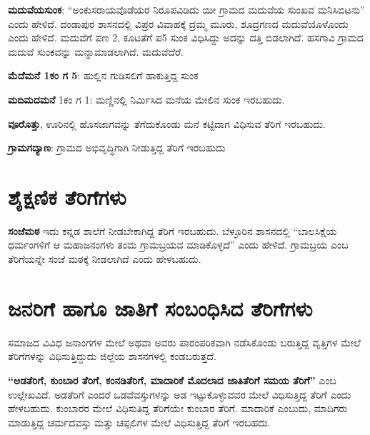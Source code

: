 \textbf{ಮದುವೆಯಸುಂಕ}: “ಅಂಕುಸರಾಯವೊಡೆಯರ ನಿರೂಪವಿಡಿದು ಯೀ ಗ್ರಾಮದ ಮದುವೆಯ ಸುಂಖವ ಮನಿಸಿಬಿಟನು” ಎಂದು ಹೇಳಿದೆ. ದಂಡಾಪುರ ಶಾಸನದಲ್ಲಿ ವಿಪ್ರರ ವಿವಾಹಕ್ಕೆ ದ್ರಮ್ಮ ಮೂರು, ಶೂದ್ರಗಣದ ಮದುವೆಯೊಳೊಂದು ಎಂದು ಹೇಳಿದೆ. ಮದುವೆಗೆ ಪಣ 2, ಕೂಟತೆಗೆ ಪ5 ಸುಂಕ ವಿಧಿಸಿದ್ದು ಅದನ್ನು ದತ್ತಿ ಬಿಡಲಾಗಿದೆ. ಹಸಗಾವಿ ಗ್ರಾಮದ ಮದುವೆ ಸುಂಕವನ್ನು ಮನ್ನಾಮಾಡಲಾಗಿದೆ. ಮದುವೆದೆರೆ.

\textbf{ಮೆದೆಮನೆ 1ಕಂ ಗ 5}: ಹುಲ್ಲಿನ ಗುಡಿಸಲಿಗೆ ಹಾಕುತ್ತಿದ್ದ ಸುಂಕ

\textbf{ಮದಿಮದಮನೆ} 1ಕಂ ಗ 1: ಮಣ್ಣಿನಲ್ಲಿ ನಿರ್ಮಿಸಿದ ಮನೆಯ ಮೇಲಿನ ಸುಂಕ ಇರಬಹುದು.

\textbf{ವೂರೊತ್ತು}, ಊರಿನಲ್ಲಿ ಹೊಸಜಾಗವನ್ನು ತೆಗೆದುಕೊಂಡು ಮನೆ ಕಟ್ಟಿದಾಗ ವಿಧಿಸುವ ತೆರಿಗೆ ಇರಬಹುದು.

\textbf{ಗ್ರಾಮಗದ್ಯಾಣ}: ಗ್ರಾಮದ ಅಭಿವೃದ್ಧಿಗಾಗಿ ನೀಡುತ್ತಿದ್ದ ತೆರಿಗೆ ಇರಬಹುದು


\section{ಶೈಕ್ಷಣಿಕ ತೆರಿಗೆಗಳು}

\textbf{ಸಂಜೆಮಠ} ಇದು ಕನ್ನಡ ಶಾಲೆಗೆ ನೀಡಬೇಕಾಗಿದ್ದ ತೆರಿಗೆ ಇರಬಹುದು. ಬೆಳ್ಳೂರಿನ ಶಾಸನದಲ್ಲಿ “ಬಾಲಸಿಕ್ಷೆಯ ಧರ್ಮಂಗಳಿಗೆ ಆ ಮಹಾಜನಂಗಳು ತಂಮ ಗ್ರಾಮಬ್ರಯವ ಮಾಡಿಕೊಳ್ಳದೆ” ಎಂದು ಹೇಳಿದೆ. ಗ್ರಾಮಬ್ರಯ ಎಂಬ ತೆರಿಗೆಯನ್ನೇ ಸಂಜೆ ಮಠಕ್ಕೆ ನೀಡಲಾಗಿದೆ ಎಂದು ಹೇಳಬಹುದು.


\section{ಜನರಿಗೆ ಹಾಗೂ ಜಾತಿಗೆ ಸಂಬಂಧಿಸಿದ ತೆರಿಗೆಗಳು}

ಸಮಾಜದ ವಿವಿಧ ಜನಾಂಗಗಳ ಮೇಲೆ ಅಥವಾ ಅವರು ಪಾರಂಪರಿಕವಾಗಿ ನಡೆಸಿಕೊಂಡು ಬರುತ್ತಿದ್ದ ವೃತ್ತಿಗಳ ಮೇಲೆ ತೆರಿಗೆಗಳನ್ನು ವಿಧಿಸುತ್ತಿದ್ದುದು ಜಿಲ್ಲೆಯ ಶಾಸನಗಳಲ್ಲಿ ಕಂಡಬರುತ್ತದೆ.

\textbf{“ಅಡತೆರಿಗೆ, ಕುಂಬಾರ ತೆರಿಗೆ, ಕಂನಡಿತೆರಿಗೆ, ಮಾದಾರಿಕೆ ಮೊದಲಾದ ಜಾತಿತೆರಿಗೆ ಸಮಯ ತೆರಿಗೆ”} ಎಂಬ ಉಲ್ಲೇಖವಿದೆ.\textbf{ }ಅಡತೆರಿಗೆ ಎಂದರೆ ಒಡವೆವಸ್ತುಗಳನ್ನು ಅಡ ಇಟ್ಟುಕೊಳ್ಳುವವರ ಮೇಲೆ ವಿಧಿಸುತ್ತಿದ್ದ ತೆರಿಗೆ ಎಂದು ಹೇಳಬಹುದು. ಕುಂಬಾರರ ಮೇಲೆ ವಿಧಿಸುತಿದ್ದ ತೆರಿಗೆಯೇ ಕುಂಬಾರ ತೆರಿಗೆ. ಮಾದಾರಿಕೆ ಎಂಬುದು, ಮಾದಿಗರು ಮಾಡುತ್ತಿದ್ದ ಚರ್ಮದವಸ್ತು ಮತ್ತು ಚಪ್ಪಲಿಗಳ ಮೇಲೆ ವಿಧಿಸುತ್ತಿದ್ದ ತೆರಿಗೆ ಇರಬಹದು. 

